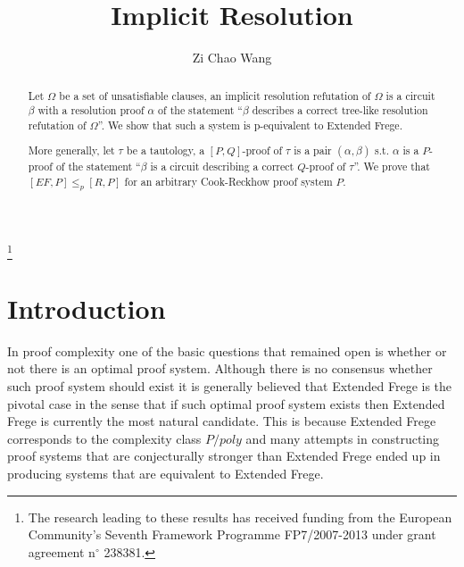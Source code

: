 \documentclass{LMCS}
\theoremstyle{plain}\newtheorem{satz}[thm]{Satz}
\begin{document}
\title[Implicit Resolution]{Implicit Resolution}

\author[Z.~C.~Wang]{Zi Chao Wang}	\address{Department of Algebra\\Faculty of Mathematics and Physics\\Charles University in Prague\\Sokolovsk\' a 83\\Praha 8-Karl\' in\\18675\\Czech Republic}	  \thanks{The research leading to these results has received funding from the European Community's Seventh Framework Programme FP7/2007-2013 under grant agreement n\ensuremath{^\circ} 238381.}	










\begin{abstract}
  Let $\Omega$ be a set of unsatisfiable clauses, an implicit
  resolution refutation of $\Omega$ is a circuit $\beta$ with a
  resolution proof $\alpha$ of the statement ``$\beta$ describes a
  correct tree-like resolution refutation of $\Omega$''. We show that
  such a system is p-equivalent to Extended Frege.

  More generally, let $\tau$ be a tautology, a $[P, Q]$-proof of
  $\tau$ is a pair $(\alpha, \beta)$ s.t. $\alpha$ is a $P$-proof of
  the statement ``$\beta$ is a circuit describing a correct $Q$-proof
  of $\tau$''. We prove that $[EF,P] \leq_p [R,P]$ for an arbitrary
  Cook-Reckhow proof system $P$.
\end{abstract}

\maketitle



\section{Introduction}

In proof complexity one of the basic questions that remained open is whether or not there is an optimal proof system. Although there is no consensus whether such proof system should exist it is generally believed that Extended Frege is the pivotal case in the sense that if such optimal proof system exists then Extended Frege is currently the most natural candidate. This is because Extended Frege corresponds to the complexity class $P/poly$ and many attempts in constructing proof systems that are conjecturally stronger than Extended Frege ended up in producing systems that are equivalent to Extended Frege.
\end{document}
